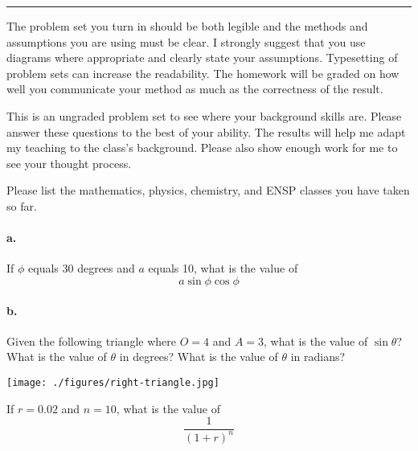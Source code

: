 \documentclass{article}
\begin{document}
\hrule
\vspace{10pt}

The problem set you turn in should be both legible and the methods and
assumptions you are using must be clear.  I strongly suggest that you
use diagrams where appropriate and clearly state your assumptions.
Typesetting of problem sets can increase the readability.  The homework
will be graded on how well you communicate your method as much as the
correctness of the result.

This is an ungraded problem set to see where your background skills are.
Please answer these questions to the best of your ability.  The results
will help me adapt my teaching to the class's background.  Please also
show enough work for me to see your thought process.


Please list the mathematics, physics, chemistry, and ENSP classes you
have taken so far.


\paragraph{a.} If $\phi$ equals 30 degrees and $a$ equals 10, what is the value of
$$ a\sin\phi\cos\phi $$


\paragraph{b.} Given the following triangle where $O=4$ and $A=3$, what is the value of
$\sin\theta$?  What is the value of $\theta$ in degrees?  What is the
value of $\theta$ in radians?

\texttt{[image: ./figures/right-triangle.jpg]}




If $r = 0.02$ and $n = 10$, what is the value of
$$ \frac{1}{(1 + r)^n} $$

\end{document}
